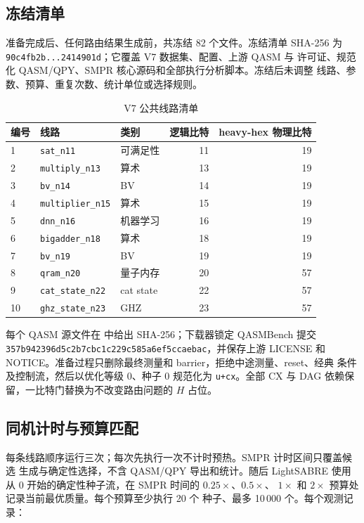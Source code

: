 \documentclass[11pt,a4paper]{article}
\begin{document}
\subsection{冻结清单}

准备完成后、任何路由结果生成前，共冻结 82 个文件。冻结清单 SHA-256 为
\nolinkurl{90c4fb2b...2414901d}；它覆盖 V7 数据集、配置、上游 QASM 与
许可证、规范化 QASM/QPY、SMPR 核心源码和全部执行分析脚本。冻结后未调整
线路、参数、预算、重复次数、统计单位或选择规则。

\begin{table}[H]
\centering
\small
\caption{V7 公共线路清单}
\begin{tabular}{lllrr}
\toprule
编号 & 线路 & 类别 & 逻辑比特 & heavy-hex 物理比特 \\
\midrule
1 & \texttt{sat\_n11} & 可满足性 & 11 & 19 \\
2 & \texttt{multiply\_n13} & 算术 & 13 & 19 \\
3 & \texttt{bv\_n14} & BV & 14 & 19 \\
4 & \texttt{multiplier\_n15} & 算术 & 15 & 19 \\
5 & \texttt{dnn\_n16} & 机器学习 & 16 & 19 \\
6 & \texttt{bigadder\_n18} & 算术 & 18 & 19 \\
7 & \texttt{bv\_n19} & BV & 19 & 19 \\
8 & \texttt{qram\_n20} & 量子内存 & 20 & 57 \\
9 & \texttt{cat\_state\_n22} & cat state & 22 & 57 \\
10 & \texttt{ghz\_state\_n23} & GHZ & 23 & 57 \\
\bottomrule
\end{tabular}
\end{table}

每个 QASM 源文件在  中给出 SHA-256；下载器锁定
QASMBench 提交
\nolinkurl{357b942396d5c2b7cbc1c229c585a6ef5ccaebac}，并保存上游 LICENSE
和 NOTICE。准备过程只删除最终测量和 barrier，拒绝中途测量、reset、经典
条件及控制流，然后以优化等级 0、种子 0 规范化为 \texttt{u+cx}。全部 CX 与
DAG 依赖保留，一比特门替换为不改变路由问题的 $H$ 占位。

\subsection{同机计时与预算匹配}

每条线路顺序运行三次；每次先执行一次不计时预热。SMPR 计时区间只覆盖候选
生成与确定性选择，不含 QASM/QPY 导出和统计。随后 LightSABRE 使用从 0
开始的确定性种子流，在 SMPR 时间的 $0.25\times$、$0.5\times$、
$1\times$ 和 $2\times$ 预算处记录当前最优质量。每个预算至少执行 20 个
种子、最多 10\,000 个。每个观测记录：
\end{document}
